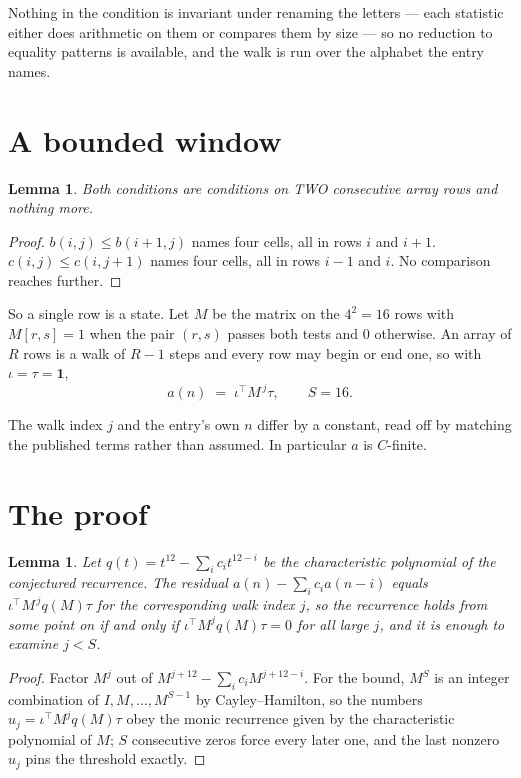\documentclass[11pt,a4paper]{article}
\theoremstyle{plain}
\newtheorem{lemma}[theorem]{Lemma}
\theoremstyle{definition}
\begin{document}
Nothing in the condition is invariant under renaming the letters --- each statistic either does
arithmetic on them or compares them by size --- so no reduction to equality patterns is
available, and the walk is run over the alphabet the entry names.

\section{A bounded window}

\begin{lemma}\label{lem:win}
Both conditions are conditions on TWO consecutive array rows and nothing more.
\end{lemma}

\begin{proof}
$b(i,j)\le b(i{+}1,j)$ names four cells, all in rows $i$ and $i+1$. $c(i,j)\le c(i,j{+}1)$
names four cells, all in rows $i-1$ and $i$. No comparison reaches further.
\end{proof}

So a single row is a state. Let $M$ be the matrix on the $4^{2}=16$ rows with
$M[r,s]=1$ when the pair $(r,s)$ passes both tests and $0$ otherwise. An array of $R$ rows is a
walk of $R-1$ steps and every row may begin or end one, so with $\iota=\tau=\mathbf{1}$,
\[
a(n)\;=\;\iota^{\!\top}M^{\,j}\tau ,\qquad S=16.
\]

The walk index $j$ and the entry's own $n$ differ by a constant, read off by matching the
published terms rather than assumed. In particular $a$ is $C$-finite.

\section{The proof}

\begin{lemma}\label{lem:crit}
Let $q(t)=t^{12}-\sum_i c_it^{12-i}$ be the characteristic polynomial of the
conjectured recurrence. The residual $a(n)-\sum_ic_ia(n-i)$ equals
$\iota^{\!\top}M^{\,j}q(M)\tau$ for the corresponding walk index $j$, so the recurrence
holds from some point on if and only if $\iota^{\!\top}M^{j}q(M)\tau=0$ for all large $j$,
and it is enough to examine $j<S$.
\end{lemma}

\begin{proof}
Factor $M^{j}$ out of $M^{j+12}-\sum_ic_iM^{j+12-i}$. For the bound, $M^{S}$
is an integer combination of $I,M,\dots,M^{S-1}$ by Cayley--Hamilton, so the numbers
$u_j=\iota^{\!\top}M^{j}q(M)\tau$ obey the monic recurrence given by the characteristic
polynomial of $M$; $S$ consecutive zeros force every later one, and the last nonzero $u_j$
pins the threshold exactly.
\end{proof}
\end{document}
